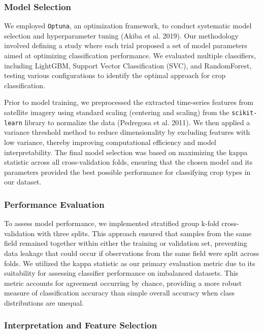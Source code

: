 \documentclass[
  journal,
  twocolumn]{IEEEtran}
\begin{document}
\hypertarget{model-selection}{%
\subsubsection{Model Selection}\label{model-selection}}

We employed \texttt{Optuna}, an optimization framework, to conduct
systematic model selection and hyperparameter tuning (Akiba et al.
2019). Our methodology involved defining a study where each trial
proposed a set of model parameters aimed at optimizing classification
performance. We evaluated multiple classifiers, including LightGBM,
Support Vector Classification (SVC), and RandomForest, testing various
configurations to identify the optimal approach for crop classification.

Prior to model training, we preprocessed the extracted time-series
features from satellite imagery using standard scaling (centering and
scaling) from the \texttt{scikit-learn} library to normalize the data
(Pedregosa et al. 2011). We then applied a variance threshold method to
reduce dimensionality by excluding features with low variance, thereby
improving computational efficiency and model interpretability. The final
model selection was based on maximizing the kappa statistic across all
cross-validation folds, ensuring that the chosen model and its
parameters provided the best possible performance for classifying crop
types in our dataset.

\hypertarget{performance-evaluation}{%
\subsubsection{Performance Evaluation}\label{performance-evaluation}}

To assess model performance, we implemented stratified group k-fold
cross-validation with three splits. This approach ensured that samples
from the same field remained together within either the training or
validation set, preventing data leakage that could occur if observations
from the same field were split across folds. We utilized the kappa
statistic as our primary evaluation metric due to its suitability for
assessing classifier performance on imbalanced datasets. This metric
accounts for agreement occurring by chance, providing a more robust
measure of classification accuracy than simple overall accuracy when
class distributions are unequal.

\hypertarget{interpretation-and-feature-selection}{%
\subsubsection{Interpretation and Feature
Selection}\label{interpretation-and-feature-selection}}
\end{document}
